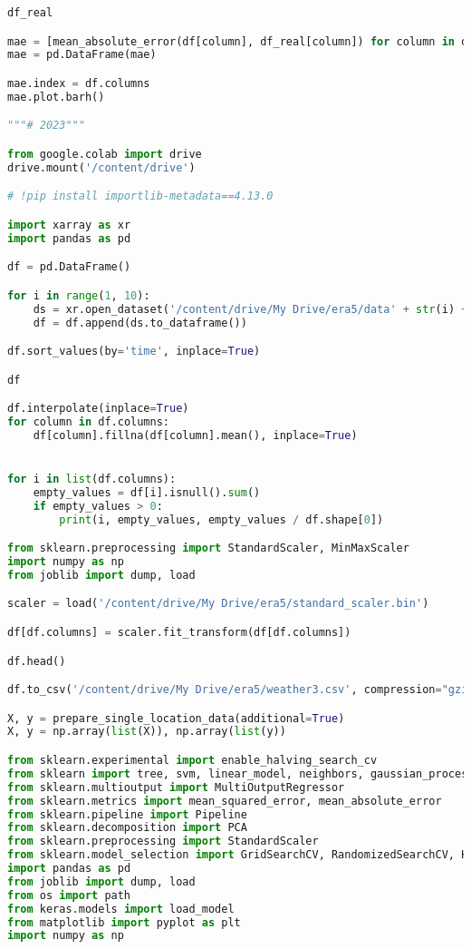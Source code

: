\begin{lstlisting}[label=python-listing,caption={Kod źródłowy},language=python]
df_real

mae = [mean_absolute_error(df[column], df_real[column]) for column in df.columns]
mae = pd.DataFrame(mae)

mae.index = df.columns
mae.plot.barh()

"""# 2023"""

from google.colab import drive
drive.mount('/content/drive')

# !pip install importlib-metadata==4.13.0

import xarray as xr
import pandas as pd

df = pd.DataFrame()

for i in range(1, 10):
    ds = xr.open_dataset('/content/drive/My Drive/era5/data' + str(i) + '.nc', engine='netcdf4')
    df = df.append(ds.to_dataframe())

df.sort_values(by='time', inplace=True)

df

df.interpolate(inplace=True)
for column in df.columns:
    df[column].fillna(df[column].mean(), inplace=True)


for i in list(df.columns):
    empty_values = df[i].isnull().sum()
    if empty_values > 0:
        print(i, empty_values, empty_values / df.shape[0])

from sklearn.preprocessing import StandardScaler, MinMaxScaler
import numpy as np
from joblib import dump, load

scaler = load('/content/drive/My Drive/era5/standard_scaler.bin')

df[df.columns] = scaler.fit_transform(df[df.columns])

df.head()

df.to_csv('/content/drive/My Drive/era5/weather3.csv', compression="gzip")

X, y = prepare_single_location_data(additional=True)
X, y = np.array(list(X)), np.array(list(y))

from sklearn.experimental import enable_halving_search_cv 
from sklearn import tree, svm, linear_model, neighbors, gaussian_process, cross_decomposition, ensemble, neural_network
from sklearn.multioutput import MultiOutputRegressor
from sklearn.metrics import mean_squared_error, mean_absolute_error
from sklearn.pipeline import Pipeline
from sklearn.decomposition import PCA
from sklearn.preprocessing import StandardScaler
from sklearn.model_selection import GridSearchCV, RandomizedSearchCV, HalvingGridSearchCV
import pandas as pd
from joblib import dump, load
from os import path
from keras.models import load_model
from matplotlib import pyplot as plt
import numpy as np


\end{lstlisting}
